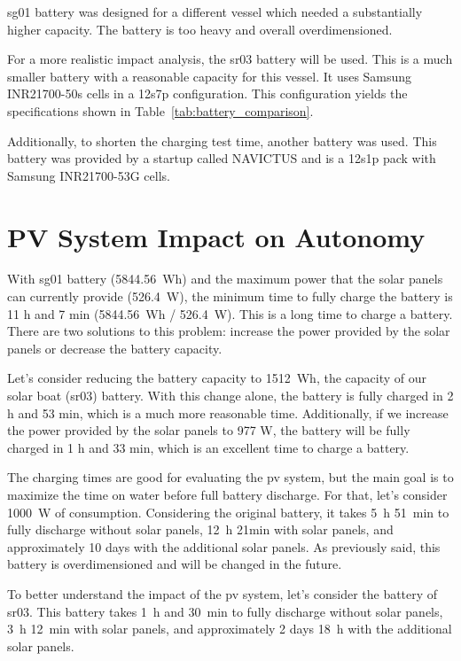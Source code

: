 \ac{sg01} battery was designed for a different vessel which needed a substantially higher capacity. The battery is too heavy and overall overdimensioned. 

For a more realistic impact analysis, the \ac{sr03} battery will be used. This is a much smaller battery with a reasonable capacity for this vessel. It uses Samsung INR21700-50s cells in a 12s7p configuration. This configuration yields the specifications shown in Table~\ref{tab:battery_comparison}.

Additionally, to shorten the charging test time, another battery was used. This battery was provided by a startup called NAVICTUS and is a 12s1p pack with Samsung INR21700-53G cells.
\section{PV System Impact on Autonomy}

With \ac{sg01} battery (5844.56~Wh) and the maximum power that the solar panels can currently provide (526.4~W), the minimum time to fully charge the battery is 11 h and 7 min (5844.56~Wh / 526.4~W). This is a long time to charge a battery. There are two solutions to this problem: increase the power provided by the solar panels or decrease the battery capacity.

Let's consider reducing the battery capacity to 1512~Wh, the capacity of our solar boat (\acs{sr03}) battery. With this change alone, the battery is fully charged in 2 h and 53 min, which is a much more reasonable time. Additionally, if we increase the power provided by the solar panels to 977 W, the battery will be fully charged in 1 h and 33 min, which is an excellent time to charge a battery.


The charging times are good for evaluating the \ac{pv} system, but the main goal is to maximize the time on water before full battery discharge. For that, let's consider 1000~W of consumption. Considering the original battery, it takes 5~h 51~min to fully discharge without solar panels, 12~h 21min with solar panels, and approximately 10 days with the additional solar panels. As previously said, this battery is overdimensioned and will be changed in the future.

To better understand the impact of the \ac{pv} system, let's consider the battery of \acs{sr03}. This battery takes 1~h and 30~min to fully discharge without solar panels, 3~h 12~min with solar panels, and approximately 2 days 18~h with the additional solar panels. 

